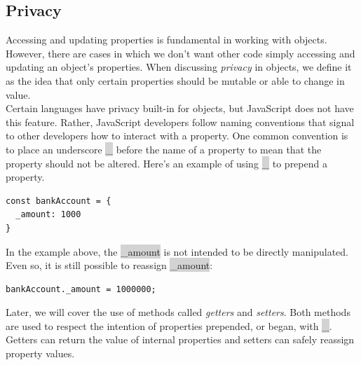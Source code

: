 \documentclass[11pt]{article}
\begin{document}
\subsection{Privacy}
Accessing and updating properties is fundamental in working with objects. However, there are cases in which we don’t want other code simply accessing and updating an object’s properties. When discussing \textit{privacy} in objects, we define it as the idea that only certain properties should be mutable or able to change in value. \\
\newline
Certain languages have privacy built-in for objects, but JavaScript does not have this feature. Rather, JavaScript developers follow naming conventions that signal to other developers how to interact with a property. One common convention is to place an underscore \colorbox{lightgray}{\_} before the name of a property to mean that the property should not be altered. Here’s an example of using \colorbox{lightgray}{\_} to prepend a property.
\begin{lstlisting}
const bankAccount = {
  _amount: 1000
}
\end{lstlisting}
In the example above, the \colorbox{lightgray}{\_amount} is not intended to be directly manipulated. Even so, it is still possible to reassign \colorbox{lightgray}{\_amount}:
\begin{lstlisting}
bankAccount._amount = 1000000;
\end{lstlisting}
Later, we will cover the use of methods called \textit{getters} and \textit{setters}. Both methods are used to respect the intention of properties prepended, or began, with \colorbox{lightgray}{\_}. Getters can return the value of internal properties and setters can safely reassign property values. 
\end{document}

